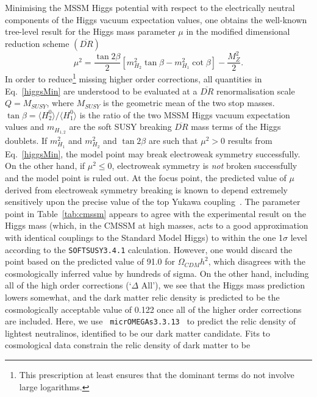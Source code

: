\documentclass[final,3p,times,pdflatex]{elsarticle}
\begin{document}
Minimising the MSSM Higgs potential with respect to the electrically neutral
components of the Higgs vacuum expectation values, one obtains the well-known
tree-level result for the Higgs mass parameter $\mu$ in the modified
dimensional reduction 
scheme $(\overline{DR})$
\begin{equation}
\mu^2 = 
 \frac{\tan 2\beta}{2} \left[m_{{H}_2}^2\tan \beta
- m_{{H}_1}^2  \cot \beta \right] - \frac{M_Z^2}{2}. \label{higgsMin}
\end{equation}
In order to reduce\footnote{This prescription at least ensures that the
  dominant terms do not involve large logarithms.} missing higher order
corrections, 
all quantities in Eq.~\ref{higgsMin} are understood to be evaluated at a
$\overline{DR}$ renormalisation scale $Q=M_{SUSY}$, where $M_{SUSY}$ is the
geometric mean of the two stop masses.  
$\tan \beta=\langle H_2^0 \rangle / \langle H_1^0 \rangle$ is the ratio of the
two MSSM Higgs vacuum expectation values
 and $m_{{H}_{1,2}}$ are the soft SUSY breaking $\overline{DR}$ mass terms of
 the Higgs doublets.
If $m_{H_1}^2$ and $m_{H_2}^2$ and $\tan 2 \beta$ are such that $\mu^2>0$
results from Eq.~\ref{higgsMin}, the
model point may break electroweak symmetry successfully. On the other hand, if
$\mu^2 \le 0$, electroweak symmetry is {\em not}\/ broken successfully and the
model point is ruled out.
At the focus point,
the predicted value of $\mu$ derived from electroweak symmetry breaking is
known to 
depend extremely sensitively upon the precise value of the top Yukawa
coupling~\cite{Allanach:2000ii}. 
The parameter point in Table~\ref{tab:cmssm}
appears to agree with the experimental result on the Higgs
mass (which, in the CMSSM at high masses, acts to a good approximation with
identical couplings to the Standard Model Higgs)
to within the one 1$\sigma$ level according to the {\tt SOFTSUSY3.4.1}
calculation. However, one would discard the point based on the predicted value
of 91.0 for $\Omega_{CDM} h^2$, which disagrees with the cosmologically inferred
value by hundreds of sigma. On the other hand, including all of the high order
corrections (`$\Delta$ All'), we see that the Higgs mass prediction lowers
somewhat, and 
the dark matter 
relic density is predicted to be the cosmologically acceptable value of 0.122
once all of the higher order corrections are included.
Here, we use {\tt
  micrOMEGAs3.3.13}~\cite{Belanger:2001fz,Belanger:2004yn,Belanger:2013oya} to 
predict the relic density of 
lightest neutralinos, identified to be our dark matter candidate. 
Fits to cosmological data constrain the relic density of dark matter to be
\end{document}
